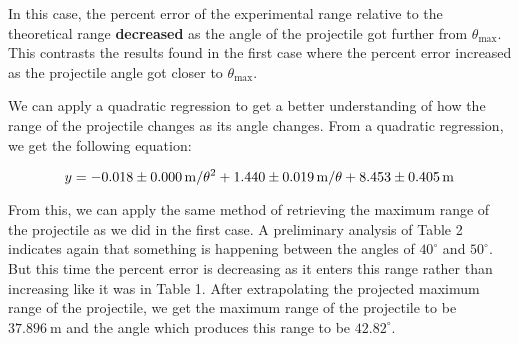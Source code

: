 \documentclass[12pt]{article}
\begin{document}
In this case, the percent error of the experimental range relative to the theoretical range \textbf{decreased} as the angle of the projectile got further from $\theta_\text{max}$. This contrasts the results found in the first case where the percent error increased as the projectile angle got closer to $\theta_\text{max}$.

We can apply a quadratic regression to get a better understanding of how the range of the projectile changes as its angle changes. From a quadratic regression, we get the following equation:




\[ y=-0.018 \pm \SI{0.000}{\metre\per\theta\squared}+1.440 \pm \SI{0.019}{\metre\per\theta}+8.453 \pm \SI{0.405}{\metre}\]

From this, we can apply the same method of retrieving the maximum range of the projectile as we did in the first case. A preliminary analysis of Table 2 indicates again that something is happening between the angles of $40^\circ$ and $50^\circ$. But this time the percent error is decreasing as it enters this range rather than increasing like it was in Table 1. After extrapolating the projected maximum range of the projectile, we get the maximum range of the projectile to be $\SI{37.896}{\metre}$ and the angle  which produces this range to be $42.82^\circ$.
\end{document}
